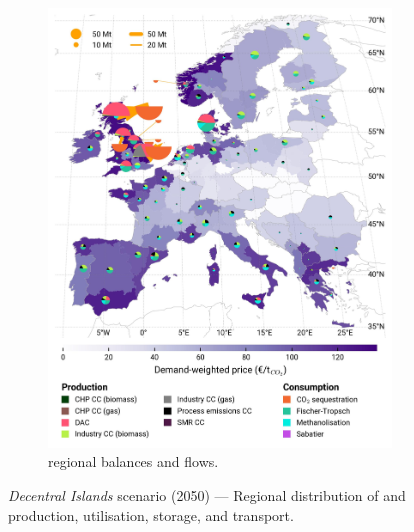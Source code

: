 \documentclass[preprint,12pt,sort&compress]{elsarticle}
\begin{document}
\begin{figure}[htbp]
\begin{subfigure}[t]{0.49\textwidth}
      \includegraphics[width=1\textwidth]{maps/no-pipelines-no-pcipmi/base_s_adm___2050-balance_map_co2_stored} 
      \vspace{-0.7cm}
      \caption{ regional balances and flows.}
      \label{fig:DI_lt_2050_co2}
  \end{subfigure}
  \caption{\textit{Decentral Islands} scenario (2050) --- Regional distribution of  and  production, utilisation, storage, and transport.}
  \label{fig:DI_lt_2050}
\end{figure}

\clearpage
\end{document}
